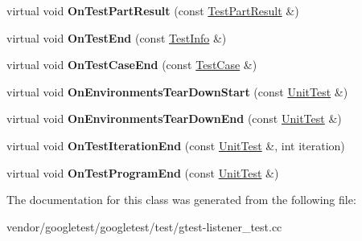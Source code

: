 \begin{DoxyCompactItemize}
virtual void {\bfseries On\+Test\+Part\+Result} (const \mbox{\hyperlink{classtesting_1_1_test_part_result}{Test\+Part\+Result}} \&)
\item 
\mbox{\label{classtesting_1_1internal_1_1_event_recording_listener_adb076f145cc20d9b27441b9c75da4b81}} 
virtual void {\bfseries On\+Test\+End} (const \mbox{\hyperlink{classtesting_1_1_test_info}{Test\+Info}} \&)
\item 
\mbox{\label{classtesting_1_1internal_1_1_event_recording_listener_a4d0cb8a389c7339bce0aa6128291529f}} 
virtual void {\bfseries On\+Test\+Case\+End} (const \mbox{\hyperlink{classtesting_1_1_test_case}{Test\+Case}} \&)
\item 
\mbox{\label{classtesting_1_1internal_1_1_event_recording_listener_a17eebd7bb5cc6bab53b20794919ca5ae}} 
virtual void {\bfseries On\+Environments\+Tear\+Down\+Start} (const \mbox{\hyperlink{classtesting_1_1_unit_test}{Unit\+Test}} \&)
\item 
\mbox{\label{classtesting_1_1internal_1_1_event_recording_listener_acd5a3dc070265166a7da68222031fd61}} 
virtual void {\bfseries On\+Environments\+Tear\+Down\+End} (const \mbox{\hyperlink{classtesting_1_1_unit_test}{Unit\+Test}} \&)
\item 
\mbox{\label{classtesting_1_1internal_1_1_event_recording_listener_ab0cc007bcfaf06cd383d574c88f62aea}} 
virtual void {\bfseries On\+Test\+Iteration\+End} (const \mbox{\hyperlink{classtesting_1_1_unit_test}{Unit\+Test}} \&, int iteration)
\item 
\mbox{\label{classtesting_1_1internal_1_1_event_recording_listener_a21fe9c3c519c4599a48b16ddfb734aa3}} 
virtual void {\bfseries On\+Test\+Program\+End} (const \mbox{\hyperlink{classtesting_1_1_unit_test}{Unit\+Test}} \&)
\end{DoxyCompactItemize}


The documentation for this class was generated from the following file\+:\begin{DoxyCompactItemize}
\item 
vendor/googletest/googletest/test/gtest-\/listener\+\_\+test.\+cc\end{DoxyCompactItemize}
